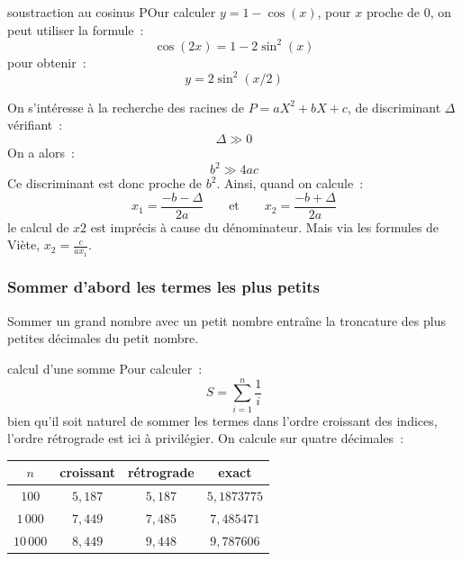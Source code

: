 \begin{exemple}{}{soustraction au cosinus}
    POur calculer $y = 1-\cos(x)$, pour $x$ proche de 0, on peut utiliser la formule~:
    $$\cos(2x) = 1 - 2\sin^2(x)$$
    pour obtenir~:
    $$y = 2 \sin^2(x/2)$$
\end{exemple}

\begin{exemple}{}{}
    On s'intéresse à la recherche des racines de $P = aX^2 + bX + c$, de discriminant $\Delta$ vérifiant~:
    $$\Delta \gg 0$$
    On a alors~:
    $$b^2 \gg 4ac$$
    Ce discriminant est donc proche de $b^2$. Ainsi, quand on calcule~:
    $$x_1 = \frac{-b-\Delta}{2a} \qquad \text{et} \qquad x_2 = \frac{-b + \Delta}{2a}$$ 
    le calcul de $x2$ est imprécis à cause du dénominateur. Mais via les formules de Viète, $x_2 = \frac{c}{ax_1}$.
\end{exemple}

\subsubsection{Sommer d'abord les termes les plus petits}
Sommer un grand nombre avec un petit nombre entraîne la troncature des plus petites décimales du petit nombre.
\begin{exemple}{}{calcul d'une somme}
    Pour calculer~:
    $$S = \sum_{i=1}^n \frac{1}{i}$$
    bien qu'il soit naturel de sommer les termes dans l'ordre croissant des indices, l'ordre rétrograde est ici à privilégier. On calcule sur quatre décimales~:\\
    \begin{center}
        \begin{tabular}{c|c|c|c}
            $n$ & croissant & rétrograde & exact\\
            \hline
            $100$ & $5,187$ & $5,187$ & $5,1873775$\\
            $1\,000$ & $7,449$ & $7,485$ & $7,485471$\\
            $10\,000$ & $8,449$ & $9,448$ & $9,787606$\\
            
        \end{tabular}
    \end{center}
\end{exemple}
